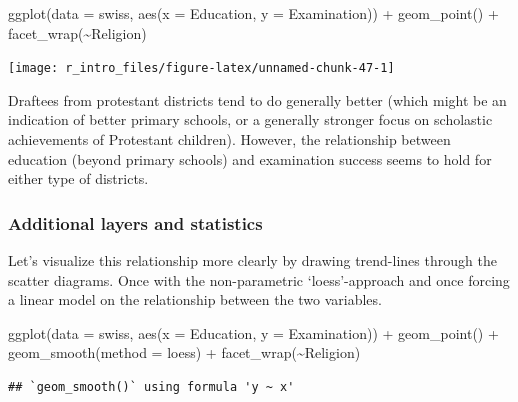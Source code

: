\documentclass[
  12pt,
]{style/krantz}
\newenvironment{Shaded}{\begin{snugshade}}{\end{snugshade}}
\newcommand{\AttributeTok}[1]{\textcolor[rgb]{0.77,0.63,0.00}{#1}}
\newcommand{\FunctionTok}[1]{\textcolor[rgb]{0.00,0.00,0.00}{#1}}
\newcommand{\NormalTok}[1]{#1}
\newcommand{\SpecialCharTok}[1]{\textcolor[rgb]{0.00,0.00,0.00}{#1}}
\newcommand{\StringTok}[1]{\textcolor[rgb]{0.31,0.60,0.02}{#1}}
\begin{document}
\begin{Shaded}
\begin{Highlighting}[]
\FunctionTok{ggplot}\NormalTok{(}\AttributeTok{data =}\NormalTok{ swiss, }\FunctionTok{aes}\NormalTok{(}\AttributeTok{x =}\NormalTok{ Education, }\AttributeTok{y =}\NormalTok{ Examination)) }\SpecialCharTok{+} 
     \FunctionTok{geom\_point}\NormalTok{() }\SpecialCharTok{+}
     \FunctionTok{facet\_wrap}\NormalTok{(}\SpecialCharTok{\textasciitilde{}}\NormalTok{Religion)}
\end{Highlighting}
\end{Shaded}

\texttt{[image: r\_intro\_files/figure-latex/unnamed-chunk-47-1]}

Draftees from protestant districts tend to do generally better (which might be an indication of better primary schools, or a generally stronger focus on scholastic achievements of Protestant children). However, the relationship between education (beyond primary schools) and examination success seems to hold for either type of districts.

\hypertarget{additional-layers-and-statistics}{%
\subsubsection{Additional layers and statistics}\label{additional-layers-and-statistics}}

Let's visualize this relationship more clearly by drawing trend-lines through the scatter diagrams. Once with the non-parametric `loess'-approach and once forcing a linear model on the relationship between the two variables.

\begin{Shaded}
\begin{Highlighting}[]
\FunctionTok{ggplot}\NormalTok{(}\AttributeTok{data =}\NormalTok{ swiss, }\FunctionTok{aes}\NormalTok{(}\AttributeTok{x =}\NormalTok{ Education, }\AttributeTok{y =}\NormalTok{ Examination)) }\SpecialCharTok{+} 
     \FunctionTok{geom\_point}\NormalTok{() }\SpecialCharTok{+}
     \FunctionTok{geom\_smooth}\NormalTok{(}\AttributeTok{method =} \StringTok{\textquotesingle{}loess\textquotesingle{}}\NormalTok{) }\SpecialCharTok{+}
     \FunctionTok{facet\_wrap}\NormalTok{(}\SpecialCharTok{\textasciitilde{}}\NormalTok{Religion)}
\end{Highlighting}
\end{Shaded}

\begin{verbatim}
## `geom_smooth()` using formula 'y ~ x'
\end{verbatim}
\end{document}
